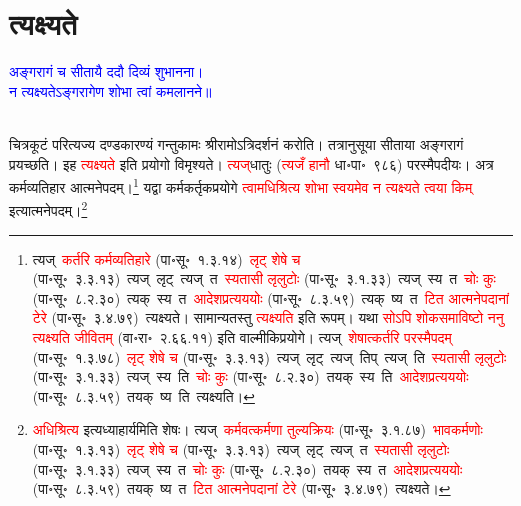 \section[त्यक्ष्यते]{त्यक्ष्यते}
\centering\textcolor{blue}{अङ्गरागं च सीतायै ददौ दिव्यं शुभानना।\nopagebreak\\
न त्यक्ष्यतेऽङ्गरागेण शोभा त्वां कमलानने॥}\nopagebreak\\
\\
\fontsize{14}{21}\selectfont\begin{sloppypar}\justifying\noindent\hspace{10mm} चित्रकूटं परित्यज्य दण्डकारण्यं गन्तुकामः श्रीरामोऽत्रि\-दर्शनं करोति। तत्रानुसूया सीताया अङ्गरागं प्रयच्छति। इह \textcolor{red}{त्यक्ष्यते} इति प्रयोगो विमृश्यते। \textcolor{red}{त्यज्‌}\-धातुः (\textcolor{red}{त्यजँ हानौ} धा॰पा॰~९८६) परस्मैपदीयः। अत्र कर्म\-व्यतिहार आत्मनेपदम्।\footnote{त्यज्~\arrow \textcolor{red}{कर्तरि कर्मव्यतिहारे} (पा॰सू॰~१.३.१४)~\arrow \textcolor{red}{लृट् शेषे च} (पा॰सू॰~३.३.१३)~\arrow त्यज्~लृट्~\arrow त्यज्~त~\arrow \textcolor{red}{स्यतासी लृलुटोः} (पा॰सू॰~३.१.३३)~\arrow त्यज्~स्य~त~\arrow \textcolor{red}{चोः कुः} (पा॰सू॰~८.२.३०)~\arrow त्यक्~स्य~त~\arrow \textcolor{red}{आदेश\-प्रत्यययोः} (पा॰सू॰~८.३.५९)~\arrow त्यक्~ष्य~त~\arrow \textcolor{red}{टित आत्मनेपदानां टेरे} (पा॰सू॰~३.४.७९)~\arrow त्यक्ष्यते। सामान्यतस्तु \textcolor{red}{त्यक्ष्यति} इति रूपम्। यथा \textcolor{red}{सोऽपि शोकसमाविष्टो ननु त्यक्ष्यति जीवितम्} (वा॰रा॰~२.६६.११) इति वाल्मीकि\-प्रयोगे। त्यज्~\arrow \textcolor{red}{शेषात्कर्तरि परस्मैपदम्} (पा॰सू॰~१.३.७८)~\arrow \textcolor{red}{लृट् शेषे च} (पा॰सू॰~३.३.१३)~\arrow त्यज्~लृट्~\arrow त्यज्~तिप्~\arrow त्यज्~ति~\arrow \textcolor{red}{स्यतासी लृलुटोः} (पा॰सू॰~३.१.३३)~\arrow त्यज्~स्य~ति~\arrow \textcolor{red}{चोः कुः} (पा॰सू॰~८.२.३०)~\arrow तयक्~स्य~ति~\arrow \textcolor{red}{आदेश\-प्रत्यययोः} (पा॰सू॰~८.३.५९)~\arrow तयक्~ष्य~ति~\arrow त्यक्ष्यति।} यद्वा कर्म\-कर्तृक\-प्रयोगे \textcolor{red}{त्वामधिश्रित्य शोभा स्वयमेव न त्यक्ष्यते त्वया किम्} इत्यात्मनेपदम्।\footnote{\textcolor{red}{अधिश्रित्य} इत्यध्याहार्यमिति शेषः। त्यज्~\arrow \textcolor{red}{कर्मवत्कर्मणा तुल्यक्रियः} (पा॰सू॰~३.१.८७)~\arrow \textcolor{red}{भावकर्मणोः} (पा॰सू॰~१.३.१३)~\arrow \textcolor{red}{लृट् शेषे च} (पा॰सू॰~३.३.१३)~\arrow त्यज्~लृट्~\arrow त्यज्~त~\arrow \textcolor{red}{स्यतासी लृलुटोः} (पा॰सू॰~३.१.३३)~\arrow त्यज्~स्य~त~\arrow \textcolor{red}{चोः कुः} (पा॰सू॰~८.२.३०)~\arrow तयक्~स्य~त~\arrow \textcolor{red}{आदेश\-प्रत्यययोः} (पा॰सू॰~८.३.५९)~\arrow तयक्~ष्य~त~\arrow \textcolor{red}{टित आत्मनेपदानां टेरे} (पा॰सू॰~३.४.७९)~\arrow त्यक्ष्यते।}\end{sloppypar}
